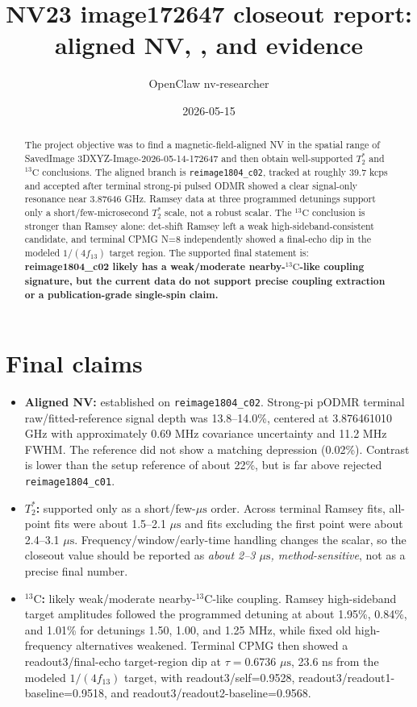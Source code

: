 \documentclass[11pt]{article}
\title{NV23 image172647 closeout report: aligned NV, \TtwoStar, and \Cthirteen{} evidence}
\author{OpenClaw nv-researcher}
\date{2026-05-15}
\newcommand{\kcps}{kcps}
\newcommand{\us}{\ensuremath{\mu\mathrm{s}}}
\newcommand{\Cthirteen}{\ensuremath{^{13}\mathrm{C}}}
\newcommand{\TtwoStar}{\ensuremath{T_2^*}}
\begin{document}
\maketitle

\begin{abstract}
The project objective was to find a magnetic-field-aligned NV in the spatial range of SavedImage 3DXYZ-Image-2026-05-14-172647 and then obtain well-supported \TtwoStar{} and \Cthirteen{} conclusions. The aligned branch is \texttt{reimage1804\_c02}, tracked at roughly 39.7 \kcps{} and accepted after terminal strong-pi pulsed ODMR showed a clear signal-only resonance near 3.87646 GHz. Ramsey data at three programmed detunings support only a short/few-microsecond \TtwoStar{} scale, not a robust scalar. The \Cthirteen{} conclusion is stronger than Ramsey alone: det-shift Ramsey left a weak high-sideband-consistent candidate, and terminal CPMG N=8 independently showed a final-echo dip in the modeled $1/(4 f_{13})$ target region. The supported final statement is: \textbf{reimage1804\_c02 likely has a weak/moderate nearby-\Cthirteen{}-like coupling signature, but the current data do not support precise coupling extraction or a publication-grade single-spin claim.}
\end{abstract}

\section{Final claims}
\begin{itemize}
  \item \textbf{Aligned NV:} established on \texttt{reimage1804\_c02}. Strong-pi pODMR terminal raw/fitted-reference signal depth was 13.8--14.0\%, centered at 3.876461010 GHz with approximately 0.69 MHz covariance uncertainty and 11.2 MHz FWHM. The reference did not show a matching depression (0.02\%). Contrast is lower than the setup reference of about 22\%, but is far above rejected \texttt{reimage1804\_c01}.
  \item \textbf{\TtwoStar:} supported only as a short/few-\us{} order. Across terminal Ramsey fits, all-point fits were about 1.5--2.1 \us{} and fits excluding the first point were about 2.4--3.1 \us{}. Frequency/window/early-time handling changes the scalar, so the closeout value should be reported as \emph{about 2--3 \us{}, method-sensitive}, not as a precise final number.
  \item \textbf{\Cthirteen:} likely weak/moderate nearby-\Cthirteen{}-like coupling. Ramsey high-sideband target amplitudes followed the programmed detuning at about 1.95\%, 0.84\%, and 1.01\% for detunings 1.50, 1.00, and 1.25 MHz, while fixed old high-frequency alternatives weakened. Terminal CPMG then showed a readout3/final-echo target-region dip at $\tau=0.6736$ \us{}, 23.6 ns from the modeled $1/(4 f_{13})$ target, with readout3/self=0.9528, readout3/readout1-baseline=0.9518, and readout3/readout2-baseline=0.9568.
\end{itemize}
\end{document}
